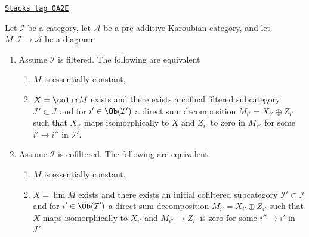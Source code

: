 \begin{lemma}
\label{homology-lemma-essentially-constant-into-karoubian}
\href{https://stacks.math.columbia.edu/tag/0A2E}{\texttt{Stacks tag 0A2E}}

Let $\mathcal{I}$ be a category, let $\mathcal{A}$ be a pre-additive
Karoubian category, and let $M : \mathcal{I} \to \mathcal{A}$ be a diagram.
\begin{enumerate}
\item Assume $\mathcal{I}$ is filtered. The following are equivalent
\begin{enumerate}
\item $M$ is essentially constant,
\item $X = \colim M$ exists and there exists a cofinal filtered subcategory
$\mathcal{I}' \subset \mathcal{I}$ and for $i' \in \Ob(\mathcal{I}')$
a direct sum decomposition $M_{i'} = X_{i'} \oplus Z_{i'}$ such that
$X_{i'}$ maps isomorphically to $X$ and $Z_{i'}$ to zero in $M_{i''}$
for some $i' \to i''$ in $\mathcal{I}'$.
\end{enumerate}
\item Assume $\mathcal{I}$ is cofiltered. The following are equivalent
\begin{enumerate}
\item $M$ is essentially constant,
\item $X = \lim M$ exists and there exists an initial cofiltered subcategory
$\mathcal{I}' \subset \mathcal{I}$ and for $i' \in \Ob(\mathcal{I}')$
a direct sum decomposition $M_{i'} = X_{i'} \oplus Z_{i'}$
such that $X$ maps isomorphically to $X_{i'}$ and $M_{i''} \to Z_{i'}$
is zero for some $i'' \to i'$ in $\mathcal{I}'$.
\end{enumerate}
\end{enumerate}
\end{lemma}


